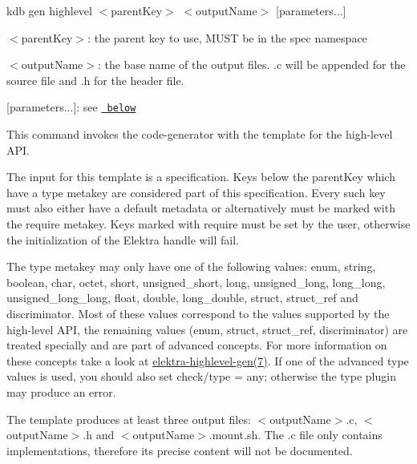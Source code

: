{\ttfamily kdb gen highlevel $<$parent\+Key$>$ $<$output\+Name$>$ \mbox{[}parameters...\mbox{]}}


\begin{DoxyItemize}
\item {\ttfamily $<$parent\+Key$>$}\+: the parent key to use, M\+U\+ST be in the {\ttfamily spec} namespace
\item {\ttfamily $<$output\+Name$>$}\+: the base name of the output files. {\ttfamily .c} will be appended for the source file and {\ttfamily .h} for the header file.
\item {\ttfamily \mbox{[}parameters...\mbox{]}}\+: see \href{\#parameters}{\texttt{ below}}
\end{DoxyItemize}

This command invokes the code-\/generator with the template for the high-\/level A\+PI.

The input for this template is a specification. Keys below the {\ttfamily parent\+Key} which have a {\ttfamily type} metakey are considered part of this specification. Every such key must also either have a {\ttfamily default} metadata or alternatively must be marked with the {\ttfamily require} metakey. Keys marked with {\ttfamily require} must be set by the user, otherwise the initialization of the Elektra handle will fail.

The {\ttfamily type} metakey may only have one of the following values\+: {\ttfamily enum}, {\ttfamily string}, {\ttfamily boolean}, {\ttfamily char}, {\ttfamily octet}, {\ttfamily short}, {\ttfamily unsigned\+\_\+short}, {\ttfamily long}, {\ttfamily unsigned\+\_\+long}, {\ttfamily long\+\_\+long}, {\ttfamily unsigned\+\_\+long\+\_\+long}, {\ttfamily float}, {\ttfamily double}, {\ttfamily long\+\_\+double}, {\ttfamily struct}, {\ttfamily struct\+\_\+ref} and {\ttfamily discriminator}. Most of these values correspond to the values supported by the high-\/level A\+PI, the remaining values ({\ttfamily enum}, {\ttfamily struct}, {\ttfamily struct\+\_\+ref}, {\ttfamily discriminator}) are treated specially and are part of advanced concepts. For more information on these concepts take a look at \mbox{\hyperlink{doc_help_elektra-highlevel-gen_md}{elektra-\/highlevel-\/gen(7)}}. If one of the advanced {\ttfamily type} values is used, you should also set {\ttfamily check/type = any}; otherwise the {\ttfamily type} plugin may produce an error.

The template produces at least three output files\+: {\ttfamily $<$output\+Name$>$.c}, {\ttfamily $<$output\+Name$>$.h} and {\ttfamily $<$output\+Name$>$.mount.\+sh}. The {\ttfamily .c} file only contains implementations, therefore its precise content will not be documented.

